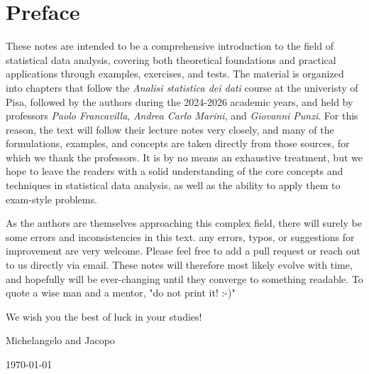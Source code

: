 \chapter*{Preface}
These notes are intended to be a comprehensive introduction to the field of statistical data analysis, 
covering both theoretical foundations and practical applications through examples, exercises, and tests. 
The material is organized into chapters that  follow the \textit{Analisi statistica dei dati} course at the univeristy of Pisa,
followed by the authors during the 2024-2026 academic years, and held by professors \textit{Paolo Francavilla}, \textit{Andrea Carlo Marini}, and \textit{Giovanni Punzi}. For this reason, the text will follow their lecture notes very closely, and many of the formulations, examples, and concepts are taken directly from those sources, for which we thank the professors. It is by no means an exhaustive treatment, but we hope to leave the readers with a solid understanding of the core concepts and techniques in statistical data analysis, as well as the ability to apply them to exam-style problems.

As the authors are themselves approaching this complex field, there will surely be some errors and inconsistencies in this text. any errors, typos, or suggestions for improvement are very welcome. Please feel free to add a pull request or reach out to us directly via email. These notes will therefore most likely evolve with time, and hopefully will be ever-changing until they converge to something readable. To quote a wise man and a mentor, "do not print it! :-)"

We wish you the best of luck in your studies!


\quad


Michelangelo and Jacopo



\today

\vfill

\doclicenseThis
